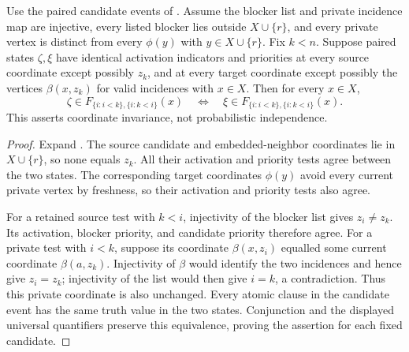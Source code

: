 \begin{helper}
Use the paired candidate events of
. Assume the
blocker list and private incidence map are injective, every listed blocker
lies outside \(X\cup\{r\}\), and every private vertex is distinct from
every \(\phi(y)\) with \(y\in X\cup\{r\}\). Fix \(k<n\).
Suppose paired states \(\zeta,\xi\) have identical activation indicators
and priorities at every source coordinate except possibly \(z_k\), and
at every target coordinate except possibly the vertices \(\beta(x,z_k)\)
for valid incidences with \(x\in X\). Then for every \(x\in X\),
\[
 \zeta\in F_{\{i:i<k\},\{i:k<i\}}(x)
 \quad\Longleftrightarrow\quad
 \xi\in F_{\{i:i<k\},\{i:k<i\}}(x).
\]
This asserts coordinate invariance, not probabilistic independence.
\end{helper}
\begin{proof}
Expand .
The source candidate and embedded-neighbor coordinates lie in
\(X\cup\{r\}\), so none equals \(z_k\). All their activation and
priority tests agree between the two states. The corresponding target
coordinates \(\phi(y)\) avoid every current private vertex by freshness,
so their activation and priority tests also agree.

For a retained source test with \(k<i\), injectivity of the blocker list
gives \(z_i\ne z_k\). Its activation, blocker priority, and candidate
priority therefore agree. For a private test with \(i<k\), suppose its
coordinate \(\beta(x,z_i)\) equalled some current coordinate
\(\beta(a,z_k)\). Injectivity of \(\beta\) would identify the two
incidences and hence give \(z_i=z_k\); injectivity of the list would then
give \(i=k\), a contradiction. Thus this private coordinate is also
unchanged. Every atomic clause in the candidate event has the same truth
value in the two states. Conjunction and the displayed universal
quantifiers preserve this equivalence, proving the assertion for each
fixed candidate.
\end{proof}
